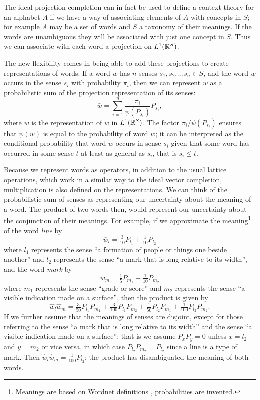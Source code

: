 \documentclass{report}
\begin{document}
The ideal projection completion can in fact be used to define a context theory for an alphabet $A$ if we have a way of associating elements of $A$ with concepts in $S$; for example $A$ may be a set of words and $S$ a taxonomy of their meanings. If the words are unambiguous they will be associated with just one concept in $S$. Thus we can associate with each word a projection on $L^1(\mathbb{R}^S)$.

The new flexibility comes in being able to add these projections to create representations of words. If a word $w$ has $n$ senses $s_1, s_2, \ldots s_n \in S$, and the word $w$ occurs in the sense $s_i$ with probability $\pi_i$, then we can represent $w$ as a probabilistic sum of the projection representation of its senses:
$$\bar{w} = \sum_{i = 1}^n \frac{\pi_i}{\psi(P_{s_i})} P_{s_i},$$
where $\bar{w}$ is the representation of $w$ in $L^1(\mathbb{R}^S)$. The factor $\pi_i/\psi(P_{s_i})$ ensures that $\psi(\bar{w})$ is equal to the probability of word $w$; it can be interpreted as the conditional probability that word $w$ occurs in sense $s_i$ given that some word has occurred in some sense $t$ at least as general as $s_i$, that is $s_i \le t$.

Because we represent words as operators, in addition to the usual lattice operations, which work in a similar way to the ideal vector completion, multiplication is also defined on the representations. We can think of the probabilistic sum of senses as representing our uncertainty about the meaning of a word. The product of two words then, would represent our uncertainty about the conjunction of their meanings. For example, if we approximate the meaning\footnote{Meanings are based on Wordnet definitions \citep{Fellbaum:98}, probabilities are invented.} of the word \emph{line} by
$$\bar{w}_l = \tfrac{3}{10}P_{l_1} + \tfrac{1}{10}P_{l_2}$$
where $l_1$ represents the sense ``a formation of people or things one beside another'' and $l_2$ represents the sense ``a mark that is long relative to its width'', and the word \emph{mark} by
$$\bar{w}_m = \tfrac{1}{5}P_{m_1} + \tfrac{1}{10}P_{m_2}$$
where $m_1$ represents the sense ``grade or score'' and $m_2$ represents the sense ``a visible indication made on a surface'', then the product is given by
$$\hat{w}_l\hat{w}_m = \tfrac{3}{50}P_{l_1}P_{m_1} + \tfrac{3}{100}P_{l_1}P_{m_2} + \tfrac{1}{50}P_{l_2}P_{m_1} + \tfrac{1}{100}P_{l_2}P_{m_2} .$$
If we further assume that the meanings of senses are disjoint, except for those referring to the sense ``a mark that is long relative to its width'' and the sense ``a visible indication made on a surface''; that is we assume $P_xP_y = 0$ unless $x = l_2$ and $y = m_2$ or vice versa, in which case $P_{l_2}P_{m_2} = P_{l_2}$ since a line is a type of mark. Then $\hat{w}_l\hat{w}_m = \tfrac{1}{100}P_{l_2}$; the product has disambiguated the meaning of both words.
\end{document}
